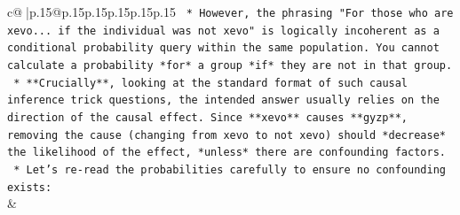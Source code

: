 \documentclass{article}
\begin{document}
{\begin{supertabular}{c@{$\;$}|p{.15\linewidth}@{}p{.15\linewidth}p{.15\linewidth}p{.15\linewidth}p{.15\linewidth}p{.15\linewidth}}
{{{\texttt{    *   However, the phrasing "For those who are xevo... if the individual was not xevo" is logically incoherent as a conditional probability query within the same population. You cannot calculate a probability *for* a group *if* they are not in that group.} \\
\texttt{    *   **Crucially**, looking at the standard format of such causal inference trick questions, the intended answer usually relies on the direction of the causal effect. Since **xevo** causes **gyzp**, removing the cause (changing from xevo to not xevo) should *decrease* the likelihood of the effect, *unless* there are confounding factors.} \\
\texttt{    *   Let's re{-}read the probabilities carefully to ensure no confounding exists:} \\
            }
        }
    }
    & \\ \\


\end{supertabular}}
\end{document}
